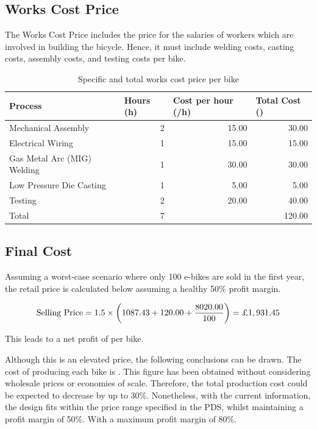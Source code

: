 \documentclass[a4paper,11pt]{article}
\begin{document}
\subsection{Works Cost Price}

The Works Cost Price includes the price for the salaries of workers which are involved in building the bicycle. Hence, it must include welding costs, casting costs, assembly costs, and testing costs per bike. 

\begin{table}[!ht]
	\centering
	\caption{Specific and total works cost price per bike}
	\begin{tabular}{l r r r}
		\hline
		\multicolumn{1}{l}{Process}&\multicolumn{1}{l}{Hours (h)}&\multicolumn{1}{l}{Cost per hour (\textsterling/h)}&\multicolumn{1}{l}{Total Cost (\textsterling)}\\\hline
		Mechanical Assembly&2&15.00&30.00\\
		Electrical Wiring&1&15.00&15.00\\
		Gas Metal Arc (MIG) Welding&1&30.00&30.00\\
		Low Pressure Die Casting&1&5.00&5.00\\
		Testing&2&20.00&40.00\\\hline
		Total&7&&120.00\\\hline
	\end{tabular}
\end{table}

\subsection{Final Cost}

Assuming a worst-case scenario where only 100 e-bikes are sold in the first year, the retail price is calculated below assuming a healthy 50\% profit margin. 

\[
	\text{Selling Price} = 1.5 \times \left(1087.43+120.00+\frac{8020.00}{100}\right) =\text{\textsterling}1,931.45
\]

This leads to a net profit of  per bike.

Although this is an elevated price, the following conclusions can be drawn. The cost of producing each bike is . This figure has been obtained without considering wholesale prices or economies of scale. Therefore, the total production cost could be expected to decrease by up to 30\%. Nonetheless, with the current information, the design fits within the price range specified in the PDS, whilst maintaining a profit margin of 50\%. With a maximum profit margin of 80\%. 
\end{document}

